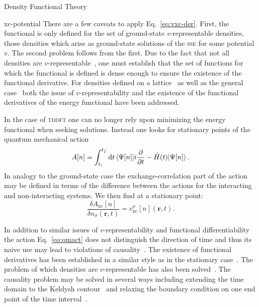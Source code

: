\documentclass[a5paper, 9 pt]{extreport}
\begin{document}
\begin{chapter}{Density Functional Theory \label{chap:dft}}
\begin{section}{xc-potential \label{sec:xcpot}}
      There are a few caveats to apply Eq.~\eqref{eq:vxc-der}. First, the functional is only defined
      for the set of ground-state $v$-representable densities, those densities which arise as
      ground-state solutions of the \textsc{sse} for some potential $v$. The second problem follows
      from the first. Due to the fact that not all densities are $v$-representable~\cite{not-vrep1,
      not-vrep2, not-vrep3}, one must establish that the set of functions for which the functional is
      defined is dense enough to ensure the existence of the functional derivative. For densities
      defined on a lattice~\cite{vrep-lat} as well as the general case~\cite{nonint1, nonint2,
      vrep-levy1, not-vrep1, vrep-lieb, vrep-rev} both the issue of $v$-representability and the
      existence of the functional derivatives of the energy functional have been addressed.

      In the case of \textsc{tddft} one can no longer rely upon minimizing the energy functional when
      seeking solutions. Instead one looks for stationary points of the quantum mechanical
      action~\cite{qmaction}
      \begin{equation} \label{eq:qmact}
         A[n] = \int^{t_f}_{t_i} \mathrm{d}t
            \braket{\Psi[n] |i\frac{\partial}{\partial t} -\hat{H}(t) | \Psi[n]}.
      \end{equation}
      In analogy to the ground-state case the exchange-correlation part of the action may be defined in
      terms of the difference between the actions for the interacting and non-interacting systems. We
      then find at a stationary point:
      \begin{equation} \label{eq:tdvxc-der}
         \frac{\delta A_\mathrm{xc}[n]}{\delta n_\sigma(\mathbf{r},t)}
            = v^\sigma_\mathrm{xc}[n](\mathbf{r},t).
      \end{equation}

      In addition to similar issues of $v$-representability and functional differentiability the action
      Eq.~\eqref{eq:qmact} does not distinguish the direction of time and thus its naive use may lead
      to violations of causality~\cite{tddft-causality}. The existence of functional derivatives has
      been established in a similar style as in the stationary case~\cite{td-welldef}. The problem of
      which densities are $v$-representable has also been solved~\cite{td-vrep}. The causality problem
      may be solved in several ways including extending the time domain to the Keldysh
      contour~\cite{caus-sol1} and relaxing the boundary condition on one end point of the time
      interval~\cite{caus-sol2}.


\end{section}
\end{chapter}
\end{document}
